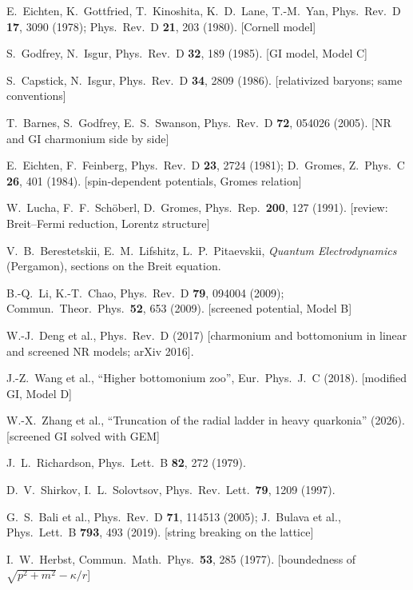 \documentclass[11pt,a4paper]{article}
\numberwithin{equation}{section}
\theoremstyle{definition}
\theoremstyle{plain}
\theoremstyle{remark}
\numberwithin{algorithm}{section}
\begin{document}
\begin{small}
\begin{enumerate}[label={[\arabic*]},leftmargin=2.2em,itemsep=1pt]
\item E.~Eichten, K.~Gottfried, T.~Kinoshita, K.~D.~Lane, T.-M.~Yan, Phys.\ Rev.\ D \textbf{17}, 3090 (1978); Phys.\ Rev.\ D \textbf{21}, 203 (1980). [Cornell model]
\item S.~Godfrey, N.~Isgur, Phys.\ Rev.\ D \textbf{32}, 189 (1985). [GI model, Model C]
\item S.~Capstick, N.~Isgur, Phys.\ Rev.\ D \textbf{34}, 2809 (1986). [relativized baryons; same conventions]
\item T.~Barnes, S.~Godfrey, E.~S.~Swanson, Phys.\ Rev.\ D \textbf{72}, 054026 (2005). [NR and GI charmonium side by side]
\item E.~Eichten, F.~Feinberg, Phys.\ Rev.\ D \textbf{23}, 2724 (1981); D.~Gromes, Z.\ Phys.\ C \textbf{26}, 401 (1984). [spin-dependent potentials, Gromes relation]
\item W.~Lucha, F.~F.~Sch\"oberl, D.~Gromes, Phys.\ Rep.\ \textbf{200}, 127 (1991). [review: Breit--Fermi reduction, Lorentz structure]
\item V.~B.~Berestetskii, E.~M.~Lifshitz, L.~P.~Pitaevskii, \emph{Quantum Electrodynamics} (Pergamon), sections on the Breit equation.
\item B.-Q.~Li, K.-T.~Chao, Phys.\ Rev.\ D \textbf{79}, 094004 (2009); Commun.\ Theor.\ Phys.\ \textbf{52}, 653 (2009). [screened potential, Model B]
\item W.-J.~Deng et al., Phys.\ Rev.\ D (2017) [charmonium and bottomonium in linear and screened NR models; arXiv 2016].
\item J.-Z.~Wang et al., ``Higher bottomonium zoo'', Eur.\ Phys.\ J.\ C (2018). [modified GI, Model D]
\item W.-X.~Zhang et al., ``Truncation of the radial ladder in heavy quarkonia'' (2026). [screened GI solved with GEM]
\item J.~L.~Richardson, Phys.\ Lett.\ B \textbf{82}, 272 (1979).
\item D.~V.~Shirkov, I.~L.~Solovtsov, Phys.\ Rev.\ Lett.\ \textbf{79}, 1209 (1997).
\item G.~S.~Bali et al., Phys.\ Rev.\ D \textbf{71}, 114513 (2005); J.~Bulava et al., Phys.\ Lett.\ B \textbf{793}, 493 (2019). [string breaking on the lattice]
\item I.~W.~Herbst, Commun.\ Math.\ Phys.\ \textbf{53}, 285 (1977). [boundedness of $\sqrt{p^2+m^2}-\kappa/r$]

\end{enumerate}
\end{small}
\end{document}

